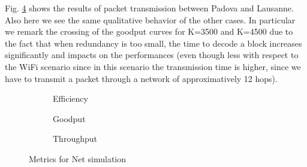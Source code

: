 Fig. \ref{fig:net} shows the results of packet transmission between Padova and Lausanne. Also here we see the same qualitative behavior of the other cases. In particular we remark the crossing of the goodput curves for K=3500 and K=4500 due to the fact that when redundancy is too small, the time to decode a block increases significantly and impacts on the performances (even though less with respect to the WiFi scenario since in this scenario the transmission time is higher, since we have to transmit a packet through a network of approximatively 12 hops).
\begin{figure}[!hp]
\centering
\begin{subfigure}{0.23\textwidth}
	\captionsetup{justification=centering,font=scriptsize}
	\centering
	\setlength\fwidth{\textwidth}
	\setlength{}
	
	\caption{Efficiency}
	\label{fig:net_eff}
\end{subfigure}\hspace{2em}%
\begin{subfigure}{0.23\textwidth}
	\captionsetup{justification=centering,font=scriptsize}
	\centering
	\setlength\fwidth{\textwidth}
	\setlength{}
	
	\caption{Goodput}
	\label{fig:net_good}
\end{subfigure}\hspace{2em}%
\begin{subfigure}{0.23\textwidth}
	\captionsetup{justification=centering,font=scriptsize}
	\centering
	\setlength\fwidth{\textwidth}
	\setlength{}
	
	\caption{Throughput}
	\label{fig:net_thr}
\end{subfigure}
\caption{Metrics for Net simulation}
\label{fig:net}
\end{figure}

